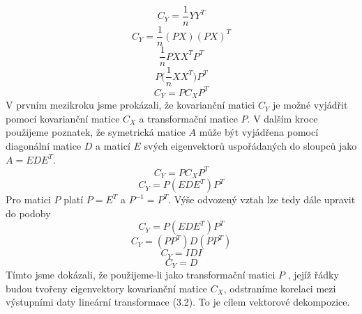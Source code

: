 \documentclass[a4paper]{book}
\begin{document}
\begin{equation*}
C_Y = \frac{1}{n}YY^T
\end{equation*}
\begin{equation*}
C_Y = \frac{1}{n}(PX)(PX)^T
\end{equation*}
\begin{equation*}
\frac{1}{n}PXX^TP^T
\end{equation*}
\begin{equation*}
P\Big(\frac{1}{n}XX^T \Big)P^T
\end{equation*}
\begin{equation*}
C_Y = P C_X P^T
\end{equation*}
V prvním mezikroku jsme prokázali, že kovarianční matici $C_Y$ je možné vyjádřit pomocí kovarianční matice $C_X$ a transformační matice $P$. V dalším kroce použijeme poznatek, že symetrická matice $A$ může být vyjádřena pomocí diagonální matice $D$ a maticí $E$ svých eigenvektorů uspořádaných do sloupců jako $A = EDE^T$.
\begin{equation*}
C_Y = PC_XP^T
\end{equation*}
\begin{equation*}
C_Y = P(EDE^T)P^T
\end{equation*}
Pro matici $P$ platí $P = E^T$ a $P^{-1} = P^T$. Výše odvozený vztah lze tedy dále upravit do podoby
\begin{equation*}
C_Y = P(EDE^T)P^T
\end{equation*}
\begin{equation*}
C_Y = (PP^T)D(PP^T)
\end{equation*}
\begin{equation*}
C_Y = IDI
\end{equation*}
\begin{equation*}
C_Y = D
\end{equation*}
Tímto jsme dokázali, že použijeme-li jako transformační matici $P$ , jejíž řádky budou tvořeny eigenvektory kovarianční matice $C_X$, odstraníme korelaci mezi výstupními daty lineární transformace (3.2). To je cílem vektorové dekompozice.
\end{document}
